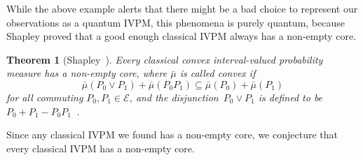 \documentclass[english,reprint, aps, prl,superscriptaddress, showpacs,
showkeys, longbibliography, amsmath, amssymb]{revtex4-1}
\theoremstyle{plain}
\newtheorem{thm}{Theorem}
\theoremstyle{definition}
\newcommand{\events}{\ensuremath{\mathcal{E}}}
\begin{document}
While the above example alerts that there might be a bad choice to
represent our observations as a quantum IVPM, this phenomena is purely
quantum, because Shapley proved that a good enough classical IVPM
always has a non-empty core.

\begin{thm}[Shapley~\cite{Shapley1971,Grabisch2016}]\label{thm:Shapley}Every
classical convex interval-valued probability measure has a non-empty
core, where $\bar{\mu}$ is called convex if 
\begin{equation}
\bar{\mu}\left(P_{0}\vee P_{1}\right)+\bar{\mu}\left(P_{0}P_{1}\right)\subseteq\bar{\mu}\left(P_{0}\right)+\bar{\mu}\left(P_{1}\right)\label{eq:QuantumInterval-valuedProbability-Convex}
\end{equation}
for all commuting $P_{0},P_{1}\in\events$, and the \emph{disjunction}~$P_{0}\vee P_{1}$
is defined to be $P_{0}+P_{1}-P_{0}P_{1}$~\cite{Griffiths2003}.\end{thm}

Since any classical IVPM we found has a non-empty core, we conjecture
that every classical IVPM has a non-empty core.


\end{document}
